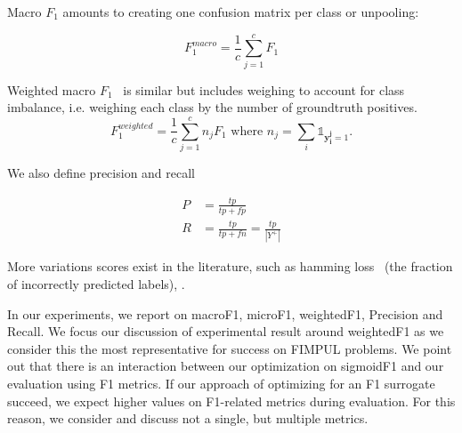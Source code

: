 Macro \(F_1\) \cite{threshForF1, multilabelMetrics} amounts to creating one confusion matrix per class or unpooling:

$$F_1^{macro} = \frac{1}{c} \sum_{j=1}^c F_1$$


Weighted macro \(F_1\)~\cite{weightedMetrics} is similar but includes weighing to account for class imbalance, i.e. weighing each class by the number of groundtruth positives.
\begin{equation}
F_1^{weighted} = \frac{1}{c} \sum_{j=1}^c n_j F_1 \text{ where } n_j = \sum_i \mathds{1}_{\mathbf{y_i^j} = 1}.
\end{equation}


We also define precision and recall

\begin{equation}
\begin{aligned} P &=\frac{t p}{t p+f p} \\ R &=\frac{t p}{t p+f n}=\frac{t p}{\left|Y^{+}\right|} \end{aligned}
\end{equation}

More variations scores exist in the literature, such as hamming loss~\cite{hammingLoss} (the fraction of incorrectly predicted labels), .

In our experiments, we report on macroF1, microF1, weightedF1, Precision and Recall. We focus our discussion of experimental result around weightedF1 as we consider this the most representative for success on FIMPUL problems. 
We point out that there is an interaction between our optimization on sigmoidF1 and our evaluation using F1 metrics. If our approach of optimizing for an F1 surrogate succeed, we expect higher values on F1-related metrics during evaluation. For this reason, we consider and discuss not a single, but multiple metrics.





